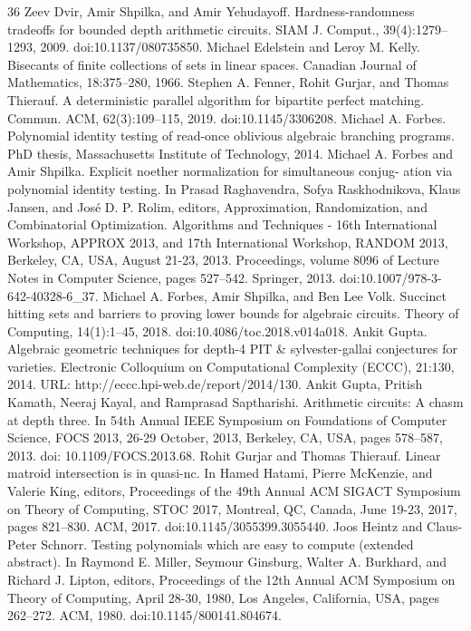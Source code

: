 \begin{thebibliography}{36}
Zeev Dvir, Amir Shpilka, and Amir Yehudayoff. Hardness-randomness tradeoffs for bounded depth arithmetic circuits. SIAM J. Comput., 39(4):1279–1293, 2009. doi:10.1137/080735850.
Michael Edelstein and Leroy M. Kelly. Bisecants of finite collections of sets in linear spaces. Canadian Journal of Mathematics, 18:375–280, 1966.
Stephen A. Fenner, Rohit Gurjar, and Thomas Thierauf. A deterministic parallel algorithm for bipartite perfect matching. Commun. ACM, 62(3):109–115, 2019. doi:10.1145/3306208.
Michael A. Forbes. Polynomial identity testing of read-once oblivious algebraic branching programs. PhD thesis, Massachusetts Institute of Technology, 2014.
Michael A. Forbes and Amir Shpilka. Explicit noether normalization for simultaneous conjug- ation via polynomial identity testing. In Prasad Raghavendra, Sofya Raskhodnikova, Klaus Jansen, and José D. P. Rolim, editors, Approximation, Randomization, and Combinatorial Optimization. Algorithms and Techniques - 16th International Workshop, APPROX 2013, and 17th International Workshop, RANDOM 2013, Berkeley, CA, USA, August 21-23, 2013. Proceedings, volume 8096 of Lecture Notes in Computer Science, pages 527–542. Springer, 2013. doi:10.1007/978-3-642-40328-6\_37.
Michael A. Forbes, Amir Shpilka, and Ben Lee Volk. Succinct hitting sets and barriers to proving lower bounds for algebraic circuits. Theory of Computing, 14(1):1–45, 2018. doi:10.4086/toc.2018.v014a018.
Ankit Gupta. Algebraic geometric techniques for depth-4 PIT \& sylvester-gallai conjectures for varieties. Electronic Colloquium on Computational Complexity (ECCC), 21:130, 2014. URL: http://eccc.hpi-web.de/report/2014/130.
Ankit Gupta, Pritish Kamath, Neeraj Kayal, and Ramprasad Saptharishi. Arithmetic circuits: A chasm at depth three. In 54th Annual IEEE Symposium on Foundations of Computer Science, FOCS 2013, 26-29 October, 2013, Berkeley, CA, USA, pages 578–587, 2013. doi: 10.1109/FOCS.2013.68.
Rohit Gurjar and Thomas Thierauf. Linear matroid intersection is in quasi-nc. In Hamed Hatami, Pierre McKenzie, and Valerie King, editors, Proceedings of the 49th Annual ACM SIGACT Symposium on Theory of Computing, STOC 2017, Montreal, QC, Canada, June 19-23, 2017, pages 821–830. ACM, 2017. doi:10.1145/3055399.3055440.
Joos Heintz and Claus-Peter Schnorr. Testing polynomials which are easy to compute (extended abstract). In Raymond E. Miller, Seymour Ginsburg, Walter A. Burkhard, and Richard J. Lipton, editors, Proceedings of the 12th Annual ACM Symposium on Theory of Computing, April 28-30, 1980, Los Angeles, California, USA, pages 262–272. ACM, 1980. doi:10.1145/800141.804674.

\end{thebibliography}
